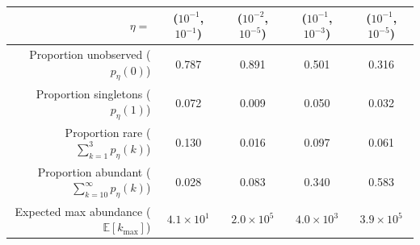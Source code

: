 \documentclass[oupdraft]{bio}
\begin{document}
\begin{table}[t]
\centering
\footnotesize
\begin{tabular}{rcccc}
  \hline
 $\eta = $ & ($10^{-1}$, $10^{-1}$) & ($10^{-2}$, $10^{-5}$) & ($10^{-1}$, $10^{-3}$) & ($10^{-1}$, $10^{-5}$) \\
  \hline
  Proportion unobserved ($p_{\eta}(0)$) & 0.787 & 0.891 & 0.501 & 0.316 \\
  Proportion singletons ($p_{\eta}(1)$) & 0.072 & 0.009 & 0.050 & 0.032 \\
  Proportion rare ($\sum_{k=1}^3 p_{\eta}(k)$) & 0.130 & 0.016 & 0.097 & 0.061 \\
  Proportion abundant ($\sum_{k=10}^{\infty} p_{\eta}(k)$) & 0.028 & 0.083 & 0.340 & 0.583 \\
Expected max abundance ($\mathbb{E}\left[k_{\text{max}}\right]$) & $4.1 \times 10^{1}$ & $2.0 \times 10^{5}$ & $4.0 \times 10^{3}$ & $3.9 \times 10^{5}$ \\
   \hline
\end{tabular}
\normalsize
\end{table}
\end{document}
